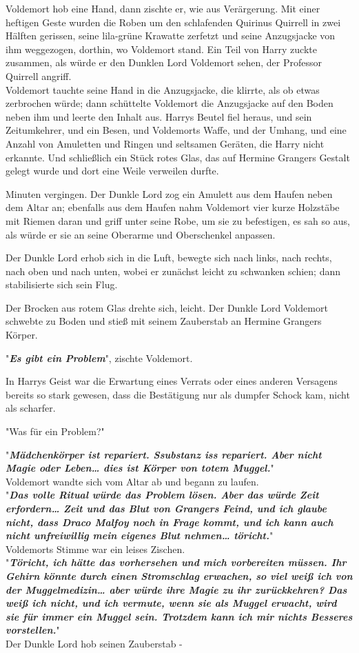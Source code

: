 {Voldemort hob eine Hand, dann zischte er, wie aus Verärgerung. Mit einer heftigen Geste wurden die Roben um den schlafenden Quirinus Quirrell in zwei Hälften gerissen, seine lila-grüne Krawatte zerfetzt und seine Anzugsjacke von ihm weggezogen, dorthin, wo Voldemort stand. Ein Teil von Harry zuckte zusammen, als würde er den Dunklen Lord Voldemort sehen, der Professor Quirrell angriff.\\ Voldemort tauchte seine Hand in die Anzugsjacke, die klirrte, als ob etwas zerbrochen würde; dann schüttelte Voldemort die Anzugsjacke auf den Boden neben ihm und leerte den Inhalt aus. Harrys Beutel fiel heraus, und sein Zeitumkehrer, und ein Besen, und Voldemorts Waffe, und der Umhang, und eine Anzahl von Amuletten und Ringen und seltsamen Geräten, die Harry nicht erkannte. Und schließlich ein Stück rotes Glas, das auf Hermine Grangers Gestalt gelegt wurde und dort eine Weile verweilen durfte.

Minuten vergingen. Der Dunkle Lord zog ein Amulett aus dem Haufen neben dem Altar an; ebenfalls aus dem Haufen nahm Voldemort vier kurze Holzstäbe mit Riemen daran und griff unter seine Robe, um sie zu befestigen, es sah so aus, als würde er sie an seine Oberarme und Oberschenkel anpassen.

Der Dunkle Lord erhob sich in die Luft, bewegte sich nach links, nach rechts, nach oben und nach unten, wobei er zunächst leicht zu schwanken schien; dann stabilisierte sich sein Flug.

Der Brocken aus rotem Glas drehte sich, leicht. Der Dunkle Lord Voldemort schwebte zu Boden und stieß mit seinem Zauberstab an Hermine Grangers Körper.

"\textbf{\emph{Es gibt ein Problem}}", zischte Voldemort.

In Harrys Geist war die Erwartung eines Verrats oder eines anderen Versagens bereits so stark gewesen, dass die Bestätigung nur als dumpfer Schock kam, nicht als scharfer.

"Was für ein Problem?"

"\textbf{\emph{Mädchenkörper ist repariert. Ssubstanz iss repariert. Aber nicht Magie oder Leben… dies ist Körper von totem Muggel.}}"\\ Voldemort wandte sich vom Altar ab und begann zu laufen.\\ "\textbf{\emph{Das volle Ritual würde das Problem lösen. Aber das würde Zeit erfordern… Zeit und das Blut von Grangers Feind, und ich glaube nicht, dass Draco Malfoy noch in Frage kommt, und ich kann auch nicht unfreiwillig mein eigenes Blut nehmen… töricht.}}"\\ Voldemorts Stimme war ein leises Zischen.\\ "\textbf{\emph{Töricht, ich hätte das vorhersehen und mich vorbereiten müssen. Ihr Gehirn könnte durch einen Stromschlag erwachen, so viel weiß ich von der Muggelmedizin… aber würde ihre Magie zu ihr zurückkehren? Das weiß ich nicht, und ich vermute, wenn sie als Muggel erwacht, wird sie für immer ein Muggel sein. Trotzdem kann ich mir nichts Besseres vorstellen.}}"\\ Der Dunkle Lord hob seinen Zauberstab -

}
